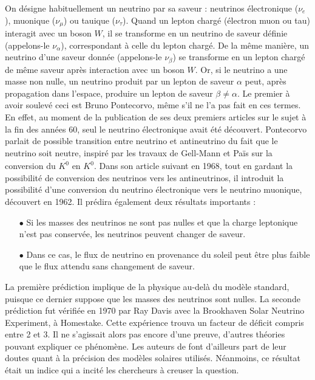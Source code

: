       On désigne habituellement un neutrino par sa saveur : neutrinos électronique ($\nu_e$), muonique ($\nu_{\mu}$) ou tauique ($\nu_{\tau}$). Quand un lepton chargé (électron muon ou tau) interagit avec un boson $W$, il se transforme en un neutrino de saveur définie (appelons-le $\nu_{\alpha}$), correspondant à celle du lepton chargé. De la même manière, un neutrino d'une saveur donnée (appelons-le $\nu_{\beta}$) se transforme en un lepton chargé de même saveur après interaction avec un boson $W$. Or, si le neutrino a une masse non nulle, un neutrino produit par un lepton de saveur $\alpha$ peut, après propagation dans l'espace, produire un lepton de saveur $\beta\ne\alpha$. Le premier à avoir soulevé ceci est Bruno Pontecorvo, même s'il ne l'a pas fait en ces termes. En effet, au moment de la publication de ses deux premiers articles\cite{Pontecorvo:1957cp,Pontecorvo:1957qd} sur le sujet à la fin des années 60, seul le neutrino électronique avait été découvert. Pontecorvo parlait de possible transition entre neutrino et antineutrino du fait que le neutrino soit neutre, inspiré par les travaux de Gell-Mann et Païs\cite{Gell-Mann1955} sur la conversion du $\overline{K^0}$ en  $K^0$. Dans son article suivant en 1968\cite{Pontecorvo1968}, tout en gardant la possibilité de conversion des neutrinos vers les antineutrinos, il introduit la possibilité d'une conversion du neutrino électronique vers le neutrino muonique, découvert en 1962\cite{Danby1962}. Il prédira également deux résultats importants :
      \begin{itemize}
        \item[$\bullet$] Si les masses des neutrinos ne sont pas nulles et que la charge leptonique n'est pas conservée, les neutrinos peuvent changer de saveur.
        \item[$\bullet$] Dans ce cas, le flux de neutrino en provenance du soleil peut être plus faible que le flux attendu sans changement de saveur.
      \end{itemize}
      La première prédiction implique de la physique au-delà du modèle standard, puisque ce dernier suppose que les masses des neutrinos sont nulles. La seconde prédiction fut vérifiée en 1970 par Ray Davis avec la Brookhaven Solar Neutrino Experiment\cite{Bahcall1976}, à Homestake. Cette expérience trouva un facteur de déficit compris entre 2 et 3. Il ne s'agissait alors pas encore d'une preuve, d'autres théories pouvant expliquer ce phénomène. Les auteurs de \cite{Bahcall1976} font d'ailleurs part de leur doutes quant à la précision des modèles solaires utilisés. Néanmoins, ce résultat était un indice qui a incité les chercheurs à creuser la question.

